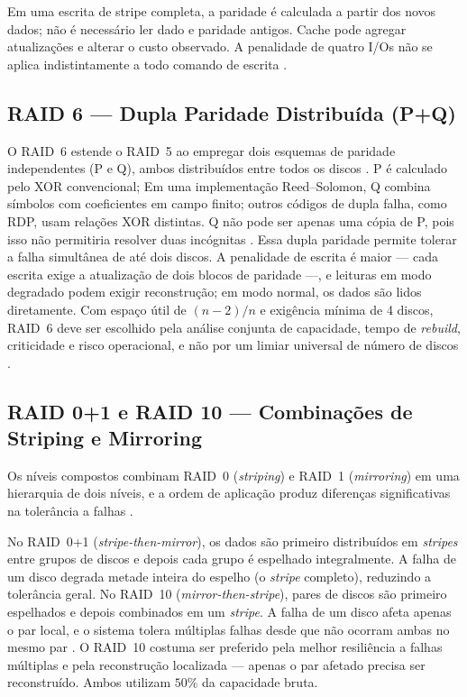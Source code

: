 \documentclass[titlepage]{article}
\begin{document}
Em uma escrita de stripe completa, a paridade é calculada a partir dos novos dados; não é necessário ler dado e paridade antigos. Cache pode agregar atualizações e alterar o custo observado. A penalidade de quatro I/Os não se aplica indistintamente a todo comando de escrita \cite{raid5_io}.

\subsection{RAID 6 --- Dupla Paridade Distribuída (P+Q)}
O RAID~6 estende o RAID~5 ao empregar dois esquemas de paridade independentes (P e Q), ambos distribuídos entre todos os discos \cite{silberschatz2020}. P é calculado pelo XOR convencional; Em uma implementação Reed--Solomon, Q combina símbolos com coeficientes em campo finito; outros códigos de dupla falha, como RDP, usam relações XOR distintas. Q não pode ser apenas uma cópia de P, pois isso não permitiria resolver duas incógnitas \cite{plank2008,corbett2004}. Essa dupla paridade permite tolerar a falha simultânea de até dois discos. A penalidade de escrita é maior --- cada escrita exige a atualização de dois blocos de paridade ---, e leituras em modo degradado podem exigir reconstrução; em modo normal, os dados são lidos diretamente. Com espaço útil de $(n-2)/n$ e exigência mínima de 4 discos, RAID~6 deve ser escolhido pela análise conjunta de capacidade, tempo de \textit{rebuild}, criticidade e risco operacional, e não por um limiar universal de número de discos \cite{silberschatz2020}.

\subsection{RAID 0+1 e RAID 10 --- Combinações de Striping e Mirroring}
Os níveis compostos combinam RAID~0 (\textit{striping}) e RAID~1 (\textit{mirroring}) em uma hierarquia de dois níveis, e a ordem de aplicação produz diferenças significativas na tolerância a falhas \cite{silberschatz2020}.

No RAID~0+1 (\textit{stripe-then-mirror}), os dados são primeiro distribuídos em \textit{stripes} entre grupos de discos e depois cada grupo é espelhado integralmente. A falha de um disco degrada metade inteira do espelho (o \textit{stripe} completo), reduzindo a tolerância geral. No RAID~10 (\textit{mirror-then-stripe}), pares de discos são primeiro espelhados e depois combinados em um \textit{stripe}. A falha de um disco afeta apenas o par local, e o sistema tolera múltiplas falhas desde que não ocorram ambas no mesmo par \cite{silberschatz2020}. O RAID~10 costuma ser preferido pela melhor resiliência a falhas múltiplas e pela reconstrução localizada --- apenas o par afetado precisa ser reconstruído. Ambos utilizam $50\%$ da capacidade bruta.
\end{document}
